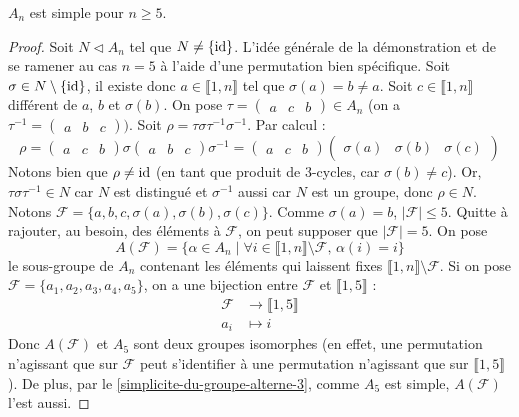 	\begin{theorem}
		$A_n$ est simple pour $n \geq 5$.
	\end{theorem}

	\begin{proof}
		Soit $N \lhd A_n$ tel que $N \neq \{ \operatorname{id} \}$. L'idée générale de la démonstration et de se ramener au cas $n = 5$ à l'aide d'une permutation bien spécifique.
		\newpar
		Soit $\sigma \in N \setminus \{ \operatorname{id} \}$, il existe donc $a \in \llbracket 1, n \rrbracket$ tel que $\sigma(a) = b \neq a$. Soit $c \in \llbracket 1, n \rrbracket$ différent de $a$, $b$ et $\sigma(b)$. On pose $\tau = \begin{pmatrix} a & c & b \end{pmatrix} \in A_n$ (on a $\tau^{-1} = \begin{pmatrix} a & b & c \end{pmatrix})$. Soit $\rho = \tau \sigma \tau^{-1} \sigma^{-1}$. Par calcul :
		\[ \rho = \begin{pmatrix} a & c & b \end{pmatrix} \sigma \begin{pmatrix} a & b & c \end{pmatrix} \sigma^{-1} = \begin{pmatrix} a & c & b \end{pmatrix} \begin{pmatrix} \sigma(a) & \sigma(b) & \sigma(c) \end{pmatrix} \]
		Notons bien que $\rho \neq \operatorname{id}$ (en tant que produit de $3$-cycles, car $\sigma(b) \neq c$). Or, $\tau \sigma \tau^{-1} \in N$ car $N$ est distingué et $\sigma^{-1}$ aussi car $N$ est un groupe, donc $\rho \in N$.
		\newpar
		Notons $\mathcal{F} = \{ a, b, c, \sigma(a), \sigma(b), \sigma(c) \}$. Comme $\sigma(a) = b$, $|\mathcal{F}| \leq 5$. Quitte à rajouter, au besoin, des éléments à $\mathcal{F}$, on peut supposer que $|\mathcal{F}| = 5$. On pose
		\[ A(\mathcal{F}) = \{ \alpha \in A_n \mid \forall i \in \llbracket 1, n \rrbracket \setminus \mathcal{F}, \, \alpha(i) = i \} \]
		le sous-groupe de $A_n$ contenant les éléments qui laissent fixes $\llbracket 1, n \rrbracket \setminus \mathcal{F}$. Si on pose $\mathcal{F} = \{ a_1, a_2, a_3, a_4, a_5 \}$, on a une bijection entre $\mathcal{F}$ et $\llbracket 1, 5 \rrbracket$ :
		\begin{align*}
			\mathcal{F} &\rightarrow \llbracket 1, 5 \rrbracket \\
			a_i &\mapsto i
		\end{align*}
		Donc $A(\mathcal{F})$ et $A_5$ sont deux groupes isomorphes (en effet, une permutation n'agissant que sur $\mathcal{F}$ peut s'identifier à une permutation n'agissant que sur $\llbracket 1, 5 \rrbracket$). De plus, par le \cref{simplicite-du-groupe-alterne-3}, comme $A_5$ est simple, $A(\mathcal{F})$ l'est aussi.

\end{proof}
